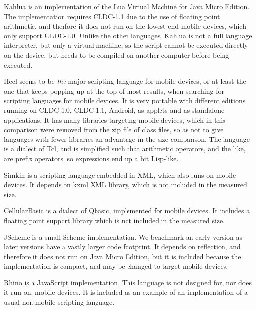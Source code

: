 \documentclass[11pt]{report}
\begin{document}
Kahlua \cite{kahlua} is an implementation of the Lua Virtual Machine for Java Micro Edition. 
The implementation requires CLDC-1.1 due to the use of floating point arithmetic, and therfore it does not run on the lowest-end mobile devices, which only support CLDC-1.0.
Unlike the other languages, Kahlua is not a full language interpreter, but only a virtual machine, so the script cannot be executed directly on the device, but needs to be compiled on another computer before being executed.

Hecl \cite{hecl} seems to be \emph{the} major scripting language for mobile devices, or at least the one that keeps popping up at the top of most results, when searching for scripting languages for mobile devices.
It is very portable with different editions running on CLDC-1.0, CLDC-1.1, Android, as applets and as standalone applications.
It has many libraries targeting mobile devices, which in this comparison were removed from the zip file of class files, so as not to give languages with fewer libraries an advantage in the size comparison.
The language is a dialect of Tcl, and is simplified such that arithmetic operators, and the like, are prefix operators, so expressions end up a bit Lisp-like.

Simkin \cite{simkin} is a scripting language embedded in XML, which also runs on mobile devices. It depends on kxml XML library, which is not included in the measured size. 

CellularBasic \cite{cellularbasic} is a dialect of Qbasic, implemented for mobile devices. 
It includes a floating point support library which is not included in the measured size. 

JScheme \cite{jscheme} is a small Scheme implementation. We benchmark an early version as later versions have a vastly larger code footprint. It depends on reflection, and therefore it does not run on Java Micro Edition, but it is included because the implementation is compact, and may be changed to target mobile devices.


Rhino \cite{rhino} is a JavaScript implementation. This language is not designed for, nor does it run on, mobile devices. It is included as an example of an implementation of a usual non-mobile scripting language.
\end{document}
